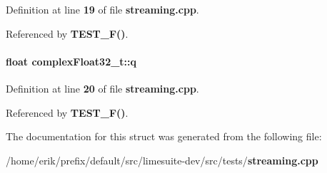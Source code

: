 Definition at line {\bf 19} of file {\bf streaming.\+cpp}.



Referenced by {\bf T\+E\+S\+T\+\_\+\+F()}.

\paragraph[{q}]{\setlength{\rightskip}{0pt plus 5cm}float complex\+Float32\+\_\+t\+::q}\label{structcomplexFloat32__t_a3da8429a9ded94308bbc70f7686095df}


Definition at line {\bf 20} of file {\bf streaming.\+cpp}.



Referenced by {\bf T\+E\+S\+T\+\_\+\+F()}.



The documentation for this struct was generated from the following file\+:\begin{DoxyCompactItemize}
\item 
/home/erik/prefix/default/src/limesuite-\/dev/src/tests/{\bf streaming.\+cpp}\end{DoxyCompactItemize}
